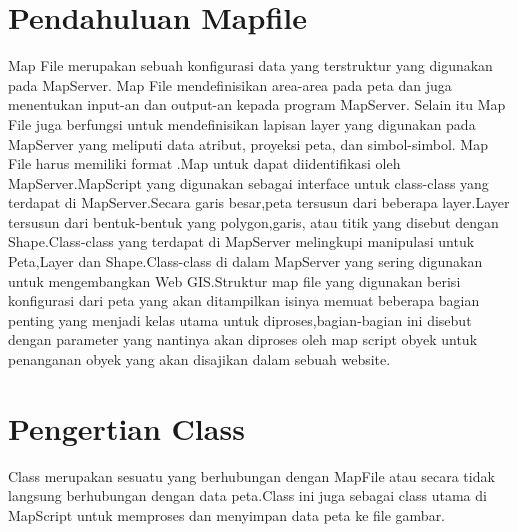 
\section{Pendahuluan Mapfile}
    Map  File  merupakan  sebuah  konfigurasi  data  yang terstruktur  yang  digunakan  pada  MapServer.  Map  File mendefinisikan  area-area  pada  peta  dan  juga  menentukan input-an dan output-an kepada program MapServer. Selain itu Map File juga berfungsi untuk mendefinisikan lapisan layer yang digunakan pada MapServer yang meliputi data atribut, proyeksi peta, dan simbol-simbol. Map File harus memiliki format .Map untuk dapat diidentifikasi oleh MapServer.MapScript yang digunakan sebagai interface untuk class-class yang terdapat di MapServer.Secara garis besar,peta tersusun dari beberapa layer.Layer tersusun dari bentuk-bentuk yang polygon,garis, atau titik yang disebut dengan Shape.Class-class yang terdapat di MapServer melingkupi manipulasi untuk Peta,Layer dan Shape.Class-class di dalam MapServer yang sering digunakan untuk mengembangkan Web GIS.Struktur map file yang digunakan berisi konfigurasi dari peta yang akan ditampilkan isinya memuat beberapa bagian penting yang menjadi kelas utama untuk diproses,bagian-bagian ini disebut dengan parameter yang nantinya akan diproses oleh map script obyek untuk penanganan obyek yang akan disajikan dalam sebuah website.

\section{Pengertian Class}
    Class merupakan sesuatu yang berhubungan dengan MapFile atau secara tidak langsung berhubungan dengan data peta.Class ini juga sebagai class utama di MapScript untuk memproses dan menyimpan data peta ke file gambar. 
    
